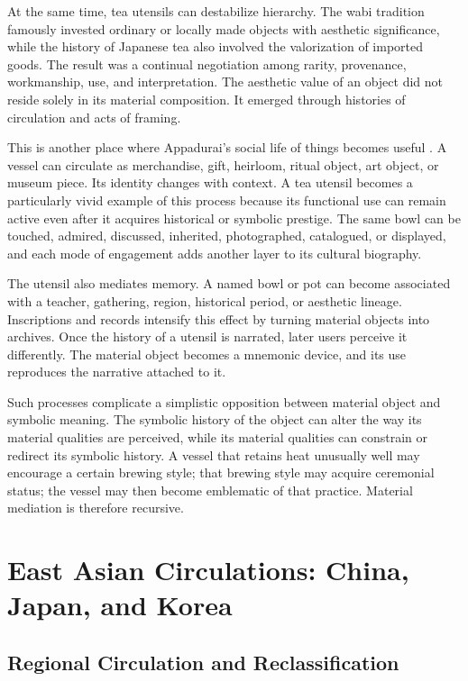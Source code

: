 \documentclass[numbers]{IntechOpen-Book}
\begin{document}
At the same time, tea utensils can destabilize hierarchy. The wabi tradition famously invested ordinary or locally made objects with aesthetic significance, while the history of Japanese tea also involved the valorization of imported goods. The result was a continual negotiation among rarity, provenance, workmanship, use, and interpretation. The aesthetic value of an object did not reside solely in its material composition. It emerged through histories of circulation and acts of framing.

This is another place where Appadurai's social life of things becomes useful \cite{appadurai1986}. A vessel can circulate as merchandise, gift, heirloom, ritual object, art object, or museum piece. Its identity changes with context. A tea utensil becomes a particularly vivid example of this process because its functional use can remain active even after it acquires historical or symbolic prestige. The same bowl can be touched, admired, discussed, inherited, photographed, catalogued, or displayed, and each mode of engagement adds another layer to its cultural biography.

The utensil also mediates memory. A named bowl or pot can become associated with a teacher, gathering, region, historical period, or aesthetic lineage. Inscriptions and records intensify this effect by turning material objects into archives. Once the history of a utensil is narrated, later users perceive it differently. The material object becomes a mnemonic device, and its use reproduces the narrative attached to it.

Such processes complicate a simplistic opposition between material object and symbolic meaning. The symbolic history of the object can alter the way its material qualities are perceived, while its material qualities can constrain or redirect its symbolic history. A vessel that retains heat unusually well may encourage a certain brewing style; that brewing style may acquire ceremonial status; the vessel may then become emblematic of that practice. Material mediation is therefore recursive.

\section{East Asian Circulations: China, Japan, and Korea}

\subsection{Regional Circulation and Reclassification}
\end{document}
